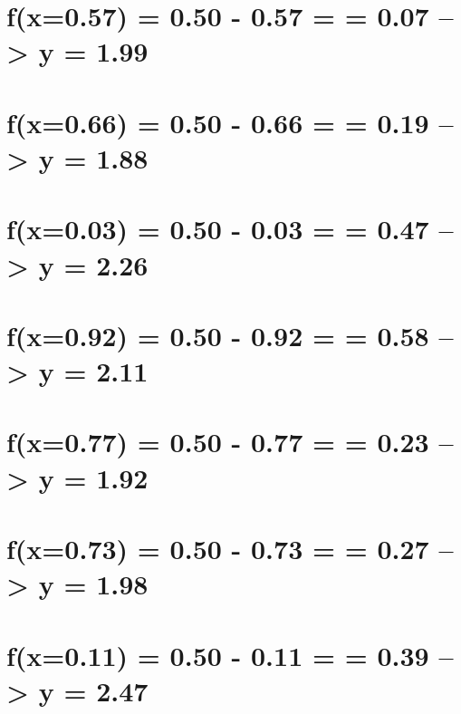 \documentclass[
  letterpaper,
  DIV=11,
  numbers=noendperiod]{scrreprt}
\begin{document}
{

\chapter{f(x=0.57) = 0.50 - 0.57 = \textbar{} = 0.07
--\textgreater{} y = 1.99}\label{fx0.57-0.50---0.57--0.07-0.07-y-1.99}


\chapter{f(x=0.66) = 0.50 - 0.66 = \textbar{} = 0.19
--\textgreater{} y = 1.88}\label{fx0.66-0.50---0.66--0.19-0.19-y-1.88}


\chapter{f(x=0.03) = 0.50 - 0.03 = \textbar{} = 0.47
--\textgreater{} y = 2.26}\label{fx0.03-0.50---0.03-0.47-0.47-y-2.26}


\chapter{f(x=0.92) = 0.50 - 0.92 = \textbar{} = 0.58
--\textgreater{} y = 2.11}\label{fx0.92-0.50---0.92--0.58-0.58-y-2.11}


\chapter{f(x=0.77) = 0.50 - 0.77 = \textbar{} = 0.23
--\textgreater{} y = 1.92}\label{fx0.77-0.50---0.77--0.23-0.23-y-1.92}


\chapter{f(x=0.73) = 0.50 - 0.73 = \textbar{} = 0.27
--\textgreater{} y = 1.98}\label{fx0.73-0.50---0.73--0.27-0.27-y-1.98}


\chapter{f(x=0.11) = 0.50 - 0.11 = \textbar{} = 0.39
--\textgreater{} y = 2.47}\label{fx0.11-0.50---0.11-0.39-0.39-y-2.47}

}
\end{document}

